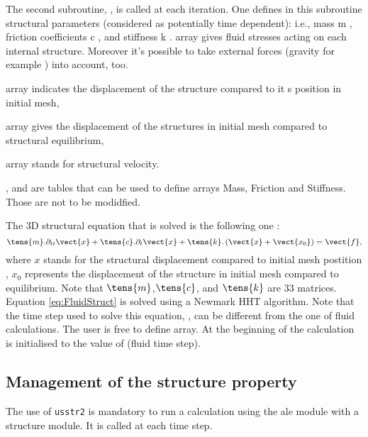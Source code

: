 {{{The second subroutine, , is called at each iteration. One defines in this
 subroutine structural parameters (considered as potentially time dependent): i.e.,
 mass m , friction coefficients c , and stiffness k .
  array gives fluid stresses acting on each internal structure. Moreover it's
 possible to take external forces (gravity for example ) into account, too.
\begin{list}{.}{}
 \item {} array indicates the displacement of the structure compared to it
s position in initial mesh,
 \item {} array gives the displacement of the structures in initial mesh
 compared to structural equilibrium,
 \item {} array stands for structural velocity.
\end{list}
,  and  are  tables that can be used to
 define arrays Mass, Friction and Stiffness. Those are not to be modidfied.

The 3D structural equation that is solved is the following one :
\begin{equation}\label{eq:FluidStruct}
\displaystyle
\tens{m}.\partial_{tt}\vect{x}+\tens{c}.\partial_{t}\vect{x}+\tens{k}.\left(\vect{x}+\vect{x_0}\right)=\vect{f},
\end{equation}
where $x$ stands for the structural displacement compared to initial mesh postition
 , $x_0$ represents
 the displacement of the structure in initial mesh compared to equilibrium.
Note that $\tens{m}$,$\tens{c}$, and $\tens{k}$ are 33 matrices.
Equation \eqref{eq:FluidStruct} is solved using a Newmark HHT algorithm.
Note that the time step used to solve this equation, , can be
 different from the one of fluid calculations. The user is free to define 
 array. At the beginning of the calculation  is initialised to the value of
  (fluid time step).

\subsection{Management of the structure property}

The use of \texttt{usstr2} is mandatory to run a calculation using the ale
 module with a structure module. It is called at each time step.

}}}
